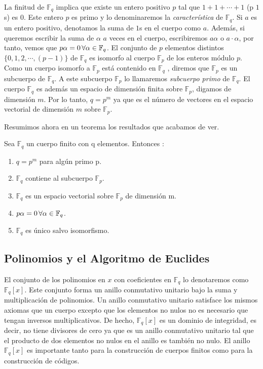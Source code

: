La finitud de $\mathbb{F}_q$ implica que existe un entero positivo $p$ tal que $1+1+\cdots + 1$ (p $1$s) es $0$. Este entero $p$ es primo y lo denominaremos la \textit{característica} de $\mathbb{F}_q$. Si $a$ es un entero positivo, denotamos la suma de $1$s en el cuerpo como $a$. Además, si queremos escribir la suma de $\alpha$ $a$ veces en el cuerpo, escribiremos $a\alpha$ o $a \cdot \alpha$, por tanto, vemos que $p\alpha = 0 \thinspace \forall \alpha \in \mathbb{F}_q$. El conjunto de $p$ elementos distintos $\{ 0,1,2,\cdots , (p-1) \}$ de $\mathbb{F}_q$ es isomorfo al cuerpo $\mathbb{F}_p$ de los enteros módulo $p$. Como un cuerpo isomorfo a $\mathbb{F}_p$ está contenido en $\mathbb{F}_q$ , diremos que $\mathbb{F}_p$ es un subcuerpo de $\mathbb{F}_q$. A este subcuerpo $\mathbb{F}_p$ lo llamaremos \textit{subcuerpo primo} de $\mathbb{F}_q$. El cuerpo $\mathbb{F}_q$ es además un espacio de dimensión finita sobre $\mathbb{F}_p$, digamos de dimensión $m$. Por lo tanto, $q = p^m$ ya que es el número de vectores en el espacio vectorial de dimensión $m$ sobre $\mathbb{F}_p$.

Resumimos ahora en un teorema los resultados que acabamos de ver.

\begin{theorem}
Sea $\mathbb{F}_q$ un cuerpo finito con q elementos. Entonces :
\begin{enumerate}
	\item $q = p^m$ para algún primo p.
	\item $\mathbb{F}_q$ contiene al subcuerpo $\mathbb{F}_p$.
	\item $\mathbb{F}_q$ es un espacio vectorial sobre $\mathbb{F}_p$ de dimensión m.
	\item $p\alpha = 0 \thinspace \forall \alpha \in \mathbb{F}_q$.
	\item $\mathbb{F}_q$ es único salvo isomorfismo.
\end{enumerate}
\end{theorem}

\subsection{Polinomios y el Algoritmo de Euclides}

El conjunto de los polinomios en $x$ con coeficientes en $\mathbb{F}_q$ lo denotaremos como $\mathbb{F}_q[x]$. Este conjunto forma un anillo conmutativo unitario bajo la suma y multiplicación de polinomios. Un anillo conmutativo unitario satisface los mismos axiomas que un cuerpo excepto que los elementos no nulos no es necesario que tengan inversos multiplicativos. De hecho, $\mathbb{F}_q[x]$ es un dominio de integridad, es decir, no tiene divisores de cero ya que es un anillo conmutativo unitario tal que el producto de dos elementos no nulos en el anillo es también no nulo. El anillo $\mathbb{F}_q[x]$ es importante tanto para la construcción de cuerpos finitos como para la construcción de códigos.

